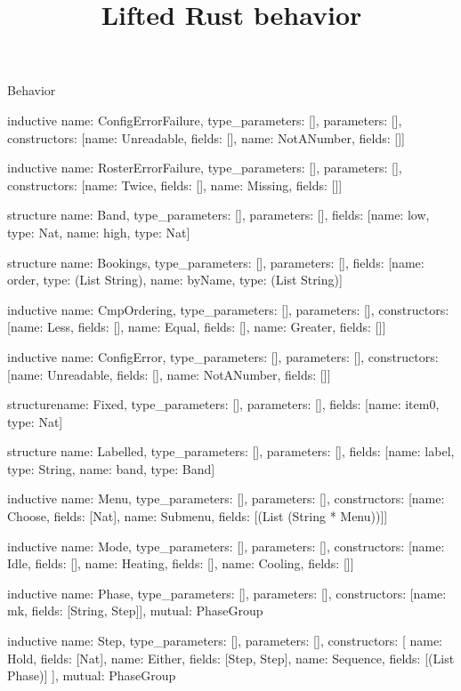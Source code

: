 \begin{lexlean}{Behavior}
\title{Lifted Rust behavior}
\begin{semanticmodule}
inductive{
  name: ConfigErrorFailure,
  type_parameters: [],
  parameters: [],
  constructors: [{name: Unreadable, fields: []}, {name: NotANumber, fields: []}]
}

inductive{
  name: RosterErrorFailure,
  type_parameters: [],
  parameters: [],
  constructors: [{name: Twice, fields: []}, {name: Missing, fields: []}]
}

structure{
  name: Band,
  type_parameters: [],
  parameters: [],
  fields: [{name: low, type: Nat}, {name: high, type: Nat}]
}

structure{
  name: Bookings,
  type_parameters: [],
  parameters: [],
  fields: [{name: order, type: (List String)}, {name: byName, type: (List String)}]
}

inductive{
  name: CmpOrdering,
  type_parameters: [],
  parameters: [],
  constructors: [{name: Less, fields: []}, {name: Equal, fields: []}, {name: Greater, fields: []}]
}

inductive{
  name: ConfigError,
  type_parameters: [],
  parameters: [],
  constructors: [{name: Unreadable, fields: []}, {name: NotANumber, fields: []}]
}

structure{name: Fixed, type_parameters: [], parameters: [], fields: [{name: item0, type: Nat}]}

structure{
  name: Labelled,
  type_parameters: [],
  parameters: [],
  fields: [{name: label, type: String}, {name: band, type: Band}]
}

inductive{
  name: Menu,
  type_parameters: [],
  parameters: [],
  constructors: [{name: Choose, fields: [Nat]}, {name: Submenu, fields: [(List (String * Menu))]}]
}

inductive{
  name: Mode,
  type_parameters: [],
  parameters: [],
  constructors: [{name: Idle, fields: []}, {name: Heating, fields: []}, {name: Cooling, fields: []}]
}

inductive{
  name: Phase,
  type_parameters: [],
  parameters: [],
  constructors: [{name: mk, fields: [String, Step]}],
  mutual: PhaseGroup
}

inductive{
  name: Step,
  type_parameters: [],
  parameters: [],
  constructors: [
    {name: Hold, fields: [Nat]},
    {name: Either, fields: [Step, Step]},
    {name: Sequence, fields: [(List Phase)]}
  ],
  mutual: PhaseGroup
}


\end{semanticmodule}
\end{lexlean}
